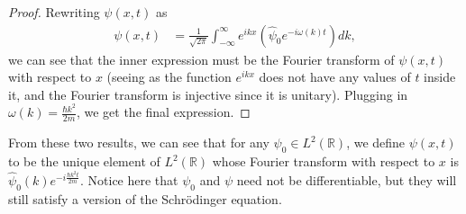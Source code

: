\documentclass[10pt]{extarticle}
\newcommand{\R}{\mathbb{R}}
\theoremstyle{plain}
\theoremstyle{definition}
\theoremstyle{remark}
\begin{document}
  \begin{proof}
    Rewriting $\psi(x,t)$ as
    \begin{align*}
      \psi(x,t) &= \frac{1}{\sqrt{2\pi}}\int_{-\infty}^{\infty}e^{ikx}\left(\hat{\psi}_0e^{-i\omega(k)t}\right)dk,
    \end{align*}
    we can see that the inner expression must be the Fourier transform of $\psi(x,t)$ with respect to $x$ (seeing as the function $e^{ikx}$ does not have any values of $t$ inside it, and the Fourier transform is injective since it is unitary). Plugging in $\omega(k) = \frac{\hbar k^2}{2m}$, we get the final expression.
  \end{proof}
  From these two results, we can see that for any $\psi_0 \in L^{2}(\R)$, we define $\psi(x,t)$ to be the unique element of $L^{2}(\R)$ whose Fourier transform with respect to $x$ is $\hat{\psi}_0(k)e^{-i\frac{\hbar k^2 t}{2m}}$. Notice here that $\psi_0$ and $\psi$ need not be differentiable, but they will still satisfy a version of the Schrödinger equation.
\end{document}
